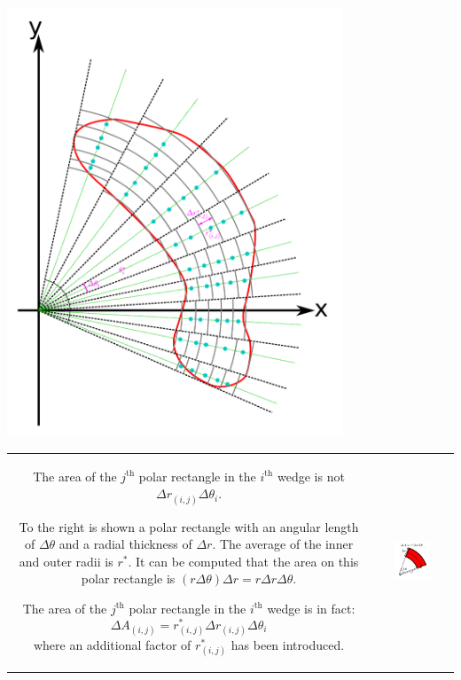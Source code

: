 \documentclass{article}
\begin{document}
\begin{center}
\includegraphics[width = 0.75\textwidth]{polar_riemann_sum}
\end{center}

\begin{tabular}{cc}
\parbox{0.5\textwidth}{
The area of the \(j^{\text{th}}\) polar rectangle in the \(i^{\text{th}}\) wedge is not \(\Delta r_{(i,j)} \Delta\theta_i\). 

To the right is shown a polar rectangle with an angular length of \(\Delta\theta\) and a radial thickness of \(\Delta r\). The average of the inner and outer radii is \(r^*\). It can be computed that the area on this polar rectangle is \((r\Delta\theta)\Delta r = r \Delta r \Delta\theta\).

The area of the \(j^{\text{th}}\) polar rectangle in the \(i^{\text{th}}\) wedge is in fact:
\[\Delta A_{(i,j)} = r_{(i,j)}^* \Delta r_{(i,j)} \Delta \theta_i\]
where an additional factor of \(r_{(i,j)}^*\) has been introduced.
} & \parbox{0.5\textwidth}{
\includegraphics[width = 0.5\textwidth]{polar_rectangle}
}
\end{tabular}
\end{document}
